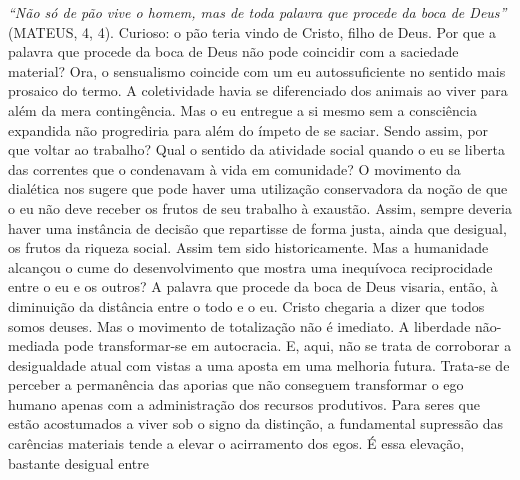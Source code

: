 \emph{``Não só de pão vive o homem, mas de toda palavra que procede da
boca de Deus''} (MATEUS, 4, 4). Curioso: o pão teria vindo de Cristo,
filho de Deus. Por que a palavra que procede da boca de Deus não pode
coincidir com a saciedade material? Ora, o sensualismo coincide com um
eu autossuficiente no sentido mais prosaico do termo. A coletividade
havia se diferenciado dos animais ao viver para além da mera
contingência. Mas o eu entregue a si mesmo sem a consciência expandida
não progrediria para além do ímpeto de se saciar. Sendo assim, por que
voltar ao trabalho? Qual o sentido da atividade social quando o eu se
liberta das correntes que o condenavam à vida em comunidade? O movimento
da dialética nos sugere que pode haver uma utilização conservadora da
noção de que o eu não deve receber os frutos de seu trabalho à exaustão.
Assim, sempre deveria haver uma instância de decisão que repartisse de
forma justa, ainda que desigual, os frutos da riqueza social. Assim tem
sido historicamente. Mas a humanidade alcançou o cume do desenvolvimento
que mostra uma inequívoca reciprocidade entre o eu e os outros? A
palavra que procede da boca de Deus visaria, então, à diminuição da
distância entre o todo e o eu. Cristo chegaria a dizer que todos somos
deuses. Mas o movimento de totalização não é imediato. A liberdade
não-mediada pode transformar-se em autocracia. E, aqui, não se trata de
corroborar a desigualdade atual com vistas a uma aposta em uma melhoria
futura. Trata-se de perceber a permanência das aporias que não conseguem
transformar o ego humano apenas com a administração dos recursos
produtivos. Para seres que estão acostumados a viver sob o signo da
distinção, a fundamental supressão das carências materiais tende a
elevar o acirramento dos egos. É essa elevação, bastante desigual entre
